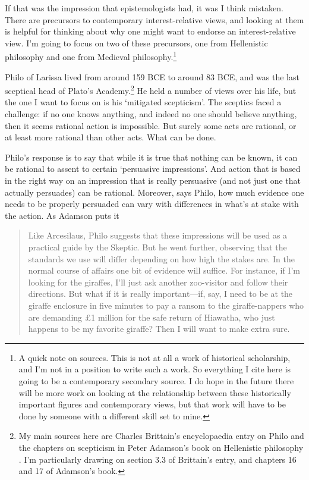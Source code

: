 \documentclass[
  11pt,
]{book}
\begin{document}
If that was the impression that epistemologists had, it was I think mistaken. There are precursors to contemporary interest-relative views, and looking at them is helpful for thinking about why one might want to endorse an interest-relative view. I'm going to focus on two of these precursors, one from Hellenistic philosophy and one from Medieval philosophy.\footnote{A quick note on sources. This is not at all a work of historical scholarship, and I'm not in a position to write such a work. So everything I cite here is going to be a contemporary secondary source. I do hope in the future there will be more work on looking at the relationship between these historically important figures and contemporary views, but that work will have to be done by someone with a different skill set to mine.}

Philo of Larissa lived from around 159 BCE to around 83 BCE, and was the last sceptical head of Plato's Academy.\footnote{My main sources here are Charles Brittain's encyclopaedia entry on Philo \citep{Brittain2021} and the chapters on scepticism in Peter Adamson's book on Hellenistic philosophy \citep{Adamson2015}. I'm particularly drawing on section 3.3 of Brittain's entry, and chapters 16 and 17 of Adamson's book.} He held a number of views over his life, but the one I want to focus on is his `mitigated scepticism'. The sceptics faced a challenge: if no one knows anything, and indeed no one should believe anything, then it seems rational action is impossible. But surely some acts are rational, or at least more rational than other acts. What can be done.

Philo's response is to say that while it is true that nothing can be known, it can be rational to assent to certain `persuasive impressions'. And action that is based in the right way on an impression that is really persuasive (and not just one that actually persuades) can be rational. Moreover, says Philo, how much evidence one needs to be properly persuaded can vary with differences in what's at stake with the action. As Adamson puts it

\begin{quote}
Like Arcesilaus, Philo suggests that these impressions will be used as a practical guide by the Skeptic. But he went further, observing that the standards we use will differ depending on how high the stakes are. In the normal course of affairs one bit of evidence will suffice. For instance, if I'm looking for the giraffes, I'll just ask another zoo-visitor and follow their directions. But what if it is really important---if, say, I need to be at the giraffe enclosure in five minutes to pay a ransom to the giraffe-nappers who are demanding £1 million for the safe return of Hiawatha, who just happens to be my favorite giraffe? Then I will want to make extra sure. \citep[112]{Adamson2015}
\end{quote}
\end{document}
